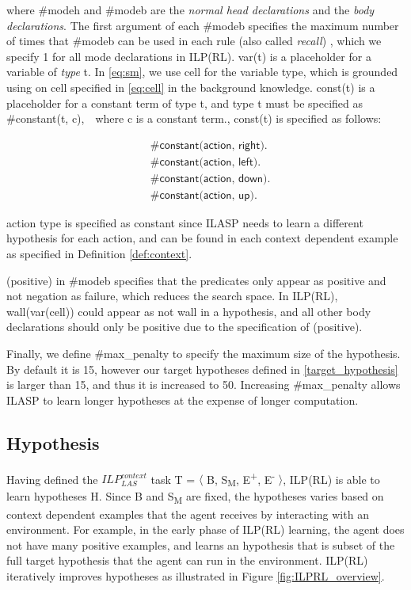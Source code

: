 where \textsf{\#modeh} and \textsf{\#modeb} are the \textit{normal head declarations} and the \textit{body declarations}. 
The first argument of each \textsf{\#modeb} specifies the maximum number of times that \textsf{\#modeb} can be used in each rule (also called \textit{recall}) \cite{Law2017}, 
which we specify 1 for all mode declarations in ILP(RL). \textsf{var(t)} is a placeholder for a variable of \textit{type} \textsf{t}. In \ref{eq:sm}, we use \textsf{cell} for the variable type, which is grounded using on \textsf{cell} specified in \ref{eq:cell} in the background knowledge.
\textsf{const(t)} is a placeholder for a constant term of type \textsf{t}, and type \textsf{t} must be specified as \textsf{\#constant(t, c)},　where \textsf{c} is a constant term., 
const(t) is specified as follows:

\begin{equation}
\begin{split}
&\textsf{\#constant(action, right).}\\
&\textsf{\#constant(action, left).}\\
&\textsf{\#constant(action, down).}\\
&\textsf{\#constant(action, up).}
\end{split}
\end{equation}

\textsf{action} type is specified as constant since ILASP needs to learn a different hypothesis for each action, 
and can be found in each context dependent example as specified in Definition \ref{def:context}.

\textsf{(positive)} in \textsf{\#modeb} specifies that the predicates only appear as positive and not negation as failure, which reduces the search space. 
In ILP(RL), \textsf{wall(var(cell))} could appear as \textsf{not wall} in a hypothesis, and all other body declarations should only be positive due to the specification of \textsf{(positive)}. 

Finally, we define \textsf{\#max\_penalty} to specify the maximum size of the hypothesis. By default it is 15, however our target hypotheses defined in \ref{target_hypothesis} is larger than 15, and thus it is increased to 50.
Increasing \#max\_penalty allows ILASP to learn longer hypotheses at the expense of longer computation.

\subsection{Hypothesis}
\label{sebsec:hypothesis}
Having defined the $ILP_{LAS}^{context}$ task T = $\langle$ B, S\textsubscript{M}, E\textsuperscript{+}, E\textsuperscript{-} $\rangle$, ILP(RL) is able to learn hypotheses H. 
Since B and S\textsubscript{M} are fixed, the hypotheses varies based on context dependent examples that the agent receives by interacting with an environment.
For example, in the early phase of ILP(RL) learning, the agent does not have many positive examples, and learns an hypothesis that is subset of the full target hypothesis that the agent can run in the environment.
ILP(RL) iteratively improves hypotheses as illustrated in Figure \ref{fig:ILPRL_overview}.

